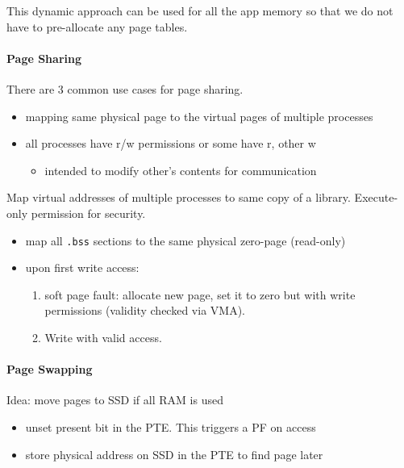 This dynamic approach can be used for all the app memory so that we do not have to pre-allocate any page tables.

\paragraph{Page Sharing}
There are 3 common use cases for page sharing.

\newpar{}

\begin{itemize}
    \item mapping same physical page to the virtual pages of multiple processes
    \item all processes have r/w permissions or some have r, other w
          \begin{itemize}
              \item intended to modify other's contents for communication
          \end{itemize}
\end{itemize}

\newpar{}

Map virtual addresses of multiple processes to same copy of a library. Execute-only permission for security.

\newpar{}

\begin{itemize}
    \item map all \texttt{.bss} sections to the same physical zero-page (read-only)
    \item upon first write access:
          \begin{enumerate}
              \item soft page fault: allocate new page, set it to zero but with write permissions (validity checked via VMA). 
              \item Write with valid access.
          \end{enumerate}
\end{itemize}

\paragraph{Page Swapping}
Idea: move pages to SSD if all RAM is used
\begin{itemize}
    \item unset present bit in the PTE. This triggers a PF on access
    \item store physical address on SSD in the PTE to find page later
\end{itemize}

